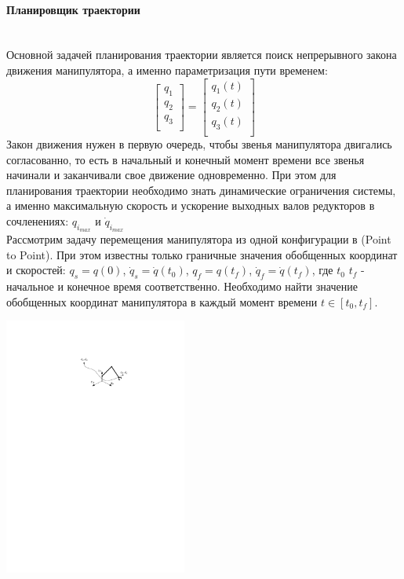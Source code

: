 \paragraph*{Планировщик траектории}$\phantom{-}$\\
\hspace*{\parindent} Основной задачей планирования траектории является поиск непрерывного закона движения манипулятора, а именно параметризация пути временем:
\begin{equation}\label{eq:model}
    \begin{bmatrix}
    q_{1} \\
    q_{2} \\
    q_{3} \\
    \end{bmatrix}
    =
     \begin{bmatrix}
    q_{1}(t) \\
    q_{2}(t) \\
    q_{3}(t) \\
    \end{bmatrix}
\end{equation} 
Закон движения нужен в первую очередь, чтобы звенья манипулятора двигались согласованно, то есть в начальный и конечный момент времени все звенья начинали и заканчивали свое движение одновременно.
При этом для планирования траектории необходимо знать динамические ограничения системы, а именно максимальную скорость и ускорение выходных валов редукторов в сочленениях: $q_{i_{max}}$ и $\dot{q}_{i_{max}}$\\
Рассмотрим задачу перемещения манипулятора из одной конфигурации в (Point to Point). При этом известны только граничные значения обобщенных координат и скоростей: $q_s=q(0)$, $\dot{q}_s=\dot{q}(t_0)$, $q_f=q(t_f)$, $\dot{q}_f=\dot{q}(t_f)$, где $t_0$ $t_f$ - начальное и конечное время соответственно. Необходимо найти значение обобщенных координат манипулятора в каждый момент времени $t\in [t_0, t_f]$.
\begin{center}
    \includegraphics[width=0.45\textwidth]{Lab4/images/trjPlanningbetweenPoint.pdf}\\
\end{center}

